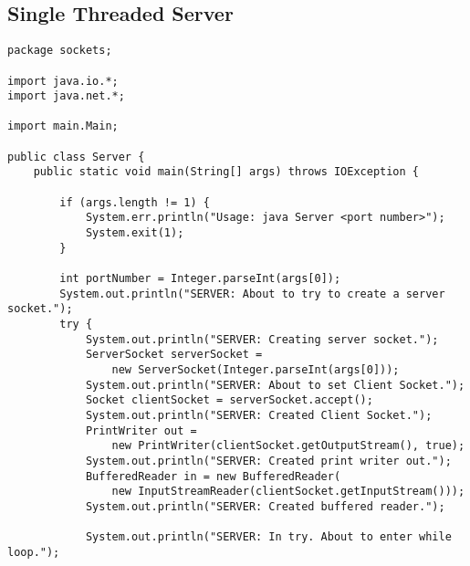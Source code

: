 \documentclass{article}
\begin{document}
	\subsection{Single Threaded Server}
		\begin{lstlisting}
package sockets;

import java.io.*;
import java.net.*;

import main.Main;

public class Server {
    public static void main(String[] args) throws IOException {
        
        if (args.length != 1) {
            System.err.println("Usage: java Server <port number>");
            System.exit(1);
        }
        
        int portNumber = Integer.parseInt(args[0]);
    	System.out.println("SERVER: About to try to create a server socket.");
        try {
       		System.out.println("SERVER: Creating server socket.");
            ServerSocket serverSocket =
                new ServerSocket(Integer.parseInt(args[0]));
            System.out.println("SERVER: About to set Client Socket.");
            Socket clientSocket = serverSocket.accept();
            System.out.println("SERVER: Created Client Socket.");
            PrintWriter out =
                new PrintWriter(clientSocket.getOutputStream(), true);
            System.out.println("SERVER: Created print writer out.");
            BufferedReader in = new BufferedReader(
                new InputStreamReader(clientSocket.getInputStream()));
            System.out.println("SERVER: Created buffered reader.");
            
            System.out.println("SERVER: In try. About to enter while loop.");


\end{lstlisting}
\end{document}
